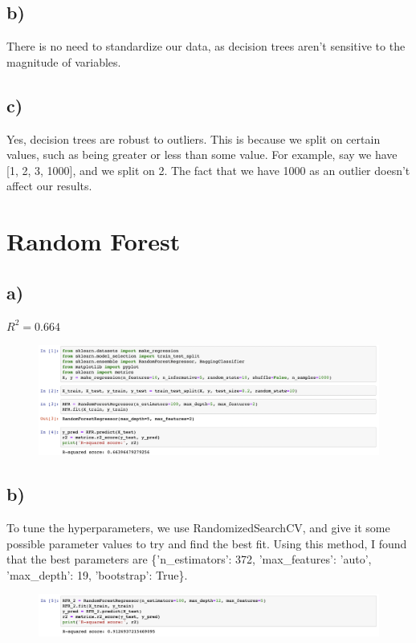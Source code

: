 \documentclass[12pt, letterpaper]{article}
\begin{document}
\subsection*{b)}There is no need to standardize our data, as decision trees aren't sensitive to the magnitude of variables.

\subsection*{c)}Yes, decision trees are robust to outliers. This is because we split on certain values, such as being greater or less than some value. For example, say we have [1, 2, 3, 1000], and we split on 2. The fact that we have 1000 as an outlier doesn't affect our results.

\newpage
\section{Random Forest}
\subsection*{a)} $R^2=0.664$
\begin{figure}[h!]
  \includegraphics[scale=0.4]{./images/4a}
\end{figure}

\subsection*{b)} To tune the hyperparameters, we use RandomizedSearchCV, and give it some possible parameter values to try and find the best fit. Using this method, I found that the best parameters are \{'n\_estimators': 372, 'max\_features': 'auto', 'max\_depth': 19, 'bootstrap': True\}.\\
\begin{figure}[h!]
  \includegraphics[scale=0.5]{./images/4b}
\end{figure}
\end{document}
